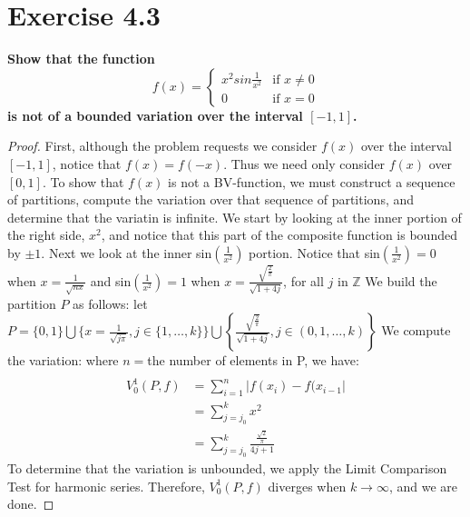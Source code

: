 \documentclass[paper=a4, fontsize=11pt]{scrartcl} %
\begin{document}
\section*{Exercise 4.3}
\boldmath
\textbf{Show that the function $$
f(x) =
\begin{cases}
x^2 sin \frac{1}{x^2}   & \text{if } x \neq 0 \\
0 & \text{if } x = 0
\end{cases}
$$
is not of a bounded variation over the interval $[-1, 1]$.}
\unboldmath
\begin{proof}
First, although the problem requests we consider $f(x)$ over the interval $[-1, 1]$, notice that $f(x) = f(-x)$.  Thus we need only consider $f(x)$ over $[0, 1]$.
\newline
To show that $f(x)$ is not a BV-function, we must construct a sequence of partitions, compute the variation over that sequence of partitions, and determine that the variatin is infinite.
\newline
We start by looking at the inner portion of the right side, $x^2$, and notice that this part of the composite function is bounded by $ \pm 1$.  Next we look at the inner  sin$\left( \frac{1}{x^2} \right)$ portion.  Notice that sin$\left(\frac{1}{x^2} \right)= 0$ when $x = \frac{1}{\sqrt{nx}}$ and sin$\left(\frac{1}{x^2} \right)= 1$ when $x = \frac{ \sqrt{\frac{2}{\pi}}}{ \sqrt{1 + 4j}}$, for all $j$ in $\mathbb{Z}$
\newline
We build the partition $P$ as follows:  let $P = \{0, 1\} \bigcup \{x = \frac{1}{\sqrt{j \pi}}, j \in \{1, \dots, k \}\} \bigcup \left\{ \frac{ \sqrt{\frac{2}{\pi}}}{ \sqrt{1 + 4j}}, j \in  {(0, 1, \dots, k) } \right\}$
\newline
We compute the variation: where $n =  $the number of elements in P, we have:
\begin{align*}
\\ V_0^1(P,f) &= \sum_{i = 1}^{n} \left| f(x_i) - f(x_{i -1} \right|
\\ &=  \sum_{j = j_0}^{k} x^2 
\\ &=  \sum_{j = j_0}^{k} \frac{ \frac{\sqrt{2}}{\pi}}{4j + 1}
\end{align*}
\newline
To determine that the variation is unbounded, we apply the Limit Comparison Test for harmonic series. Therefore, $V_{0}^{1}(P, f)$ diverges when $k \rightarrow \infty$, and we are done.
\end{proof}

\end{document}
